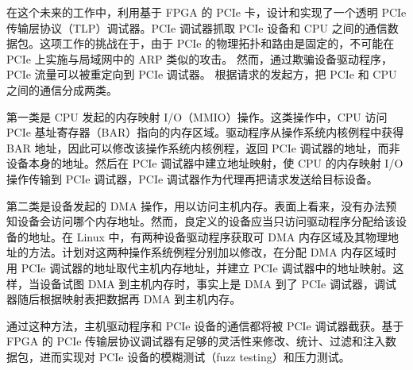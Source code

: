 在这个未来的工作中，利用基于 FPGA 的 PCIe 卡，设计和实现了一个透明 PCIe 传输层协议（TLP）调试器。PCIe 调试器抓取 PCIe 设备和 CPU 之间的通信数据包。这项工作的挑战在于，由于 PCIe 的物理拓扑和路由是固定的，不可能在 PCIe 上实施与局域网中的 ARP 类似的攻击。
然而，通过欺骗设备驱动程序，PCIe 流量可以被重定向到 PCIe 调试器。
根据请求的发起方，把 PCIe 和 CPU 之间的通信分成两类。

第一类是 CPU 发起的内存映射 I/O（MMIO）操作。这类操作中，CPU 访问 PCIe 基址寄存器（BAR）指向的内存区域。驱动程序从操作系统内核例程中获得 BAR 地址，因此可以修改该操作系统内核例程，返回 PCIe 调试器的地址，而非设备本身的地址。然后在 PCIe 调试器中建立地址映射，使 CPU 的内存映射 I/O 操作传输到 PCIe 调试器，PCIe 调试器作为代理再把请求发送给目标设备。

第二类是设备发起的 DMA 操作，用以访问主机内存。表面上看来，没有办法预知设备会访问哪个内存地址。然而，良定义的设备应当只访问驱动程序分配给该设备的地址。在 Linux 中，有两种设备驱动程序获取可 DMA 内存区域及其物理地址的方法。计划对这两种操作系统例程分别加以修改，在分配 DMA 内存区域时用 PCIe 调试器的地址取代主机内存地址，并建立 PCIe 调试器中的地址映射。这样，当设备试图 DMA 到主机内存时，事实上是 DMA 到了 PCIe 调试器，调试器随后根据映射表把数据再 DMA 到主机内存。

通过这种方法，主机驱动程序和 PCIe 设备的通信都将被 PCIe 调试器截获。基于 FPGA 的 PCIe 传输层协议调试器有足够的灵活性来修改、统计、过滤和注入数据包，进而实现对 PCIe 设备的模糊测试（fuzz testing）和压力测试。
\fi